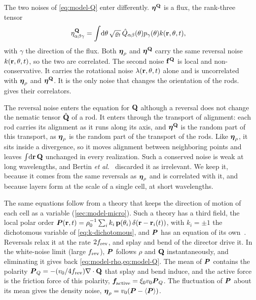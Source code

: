 \documentclass[aps,pre,reprint,superscriptaddress,longbibliography,nofootinbib
]{revtex4-2}
\begin{document}
The two noises of \cref{eq:model-Q} enter differently.
$\boldsymbol\eta^{\mathbf{Q}}$ is a flux, the rank-three tensor
\begin{equation}
\eta^{\mathbf{Q}}_{{\alpha\beta}\gamma}=\int\!\mathrm{d}\theta\,\sqrt{\varrho_t}\,\hat
Q_{\alpha\beta}(\theta)p_\gamma(\theta)k(\mathbf{r},\theta,t),
\end{equation}
with $\gamma$ the direction of the flux. Both $\boldsymbol\eta_\rho$
and $\boldsymbol\eta^{\mathbf{Q}}$ carry the same reversal noise
$k(\mathbf{r},\theta,t)$, so the two are correlated. The second
noise $\mathbf{f}^{\mathbf{Q}}$ is local and non-conservative. It carries the
rotational noise $\lambda(\mathbf{r},\theta,t)$ alone and is
uncorrelated with $\boldsymbol\eta_\rho$ and $\boldsymbol\eta^{\mathbf{Q}}$. It is the
only noise that changes the orientation of the rods.
 gives their correlators.

The reversal noise enters the equation for $\mathbf{Q}$ although a
reversal does not change the nematic tensor $\hat{\mathbf{Q}}$ of a
rod. It enters through the transport of alignment: each rod
carries its alignment as it runs along its axis, and
$\boldsymbol\eta^{\mathbf{Q}}$ is the random part of this transport, as
$\boldsymbol\eta_\rho$ is the random part of the transport of the
rods. Like $\boldsymbol\eta_\rho$, it sits inside a divergence, so it
moves alignment between neighboring points and leaves
$\int\!\mathrm{d}\mathbf{r}\,\mathbf{Q}$ unchanged in every realization. Such a
conserved noise is weak at long wavelengths, and
Bertin \textit{et al.}~\cite{bertin2013} discarded it as
irrelevant. We keep it, because it comes from the same
reversals as $\boldsymbol\eta_\rho$ and is correlated with it, and
because layers form at the scale of a single cell, at short
wavelengths.

The same equations follow from a theory that keeps the
direction of motion of each cell as a variable
(\cref{sec:model-micro}). Such a theory has a third field,
the local polar order $\boldsymbol
P(\mathbf{r},t)
=\rho_0^{-1}\sum_ik_i\,\mathbf{p}(\theta_i)\,\delta(\mathbf{r}-\mathbf{r}_i(t))$,
with $k_i=\pm1$ the dichotomous variable of
\cref{eq:k-dichotomous}, and $\boldsymbol P$ has an equation of its
own~\cite{baskaran2008hydrodynamics,banerjee2026active,
spinney2025dean}. Reversals relax it at the rate $2f_{\rm rev}$,
and splay and bend of the director drive it. In the
white-noise limit (large $f_{\rm rev}$), $\boldsymbol P$ follows $\rho$
and $\mathbf{Q}$ instantaneously, and eliminating it gives back
\cref{eq:model-rho,eq:model-Q}. The mean of $\boldsymbol P$
contains the polarity $\boldsymbol P_Q=-(v_0/4f_{\rm rev})\nabla\cdot\mathbf{Q}$
that splay and bend induce, and the active force is the
friction force of this polarity, $\boldsymbol{f}_\text{\!active}=\xi_0v_0\boldsymbol P_Q$.
The fluctuation of $\boldsymbol P$ about its mean gives the density
noise, $\boldsymbol\eta_\rho=v_0(\boldsymbol P-\langle\boldsymbol P\rangle)$.
\end{document}
